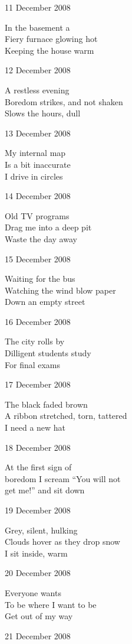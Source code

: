 \documentclass[12pt]{article}
\begin{document}
11 December 2008

In the basement a \\
Fiery furnace glowing hot \\
Keeping the house warm

12 December 2008

A restless evening \\
Boredom strikes, and not shaken \\
Slows the hours, dull

13 December 2008

My internal map \\
Is a bit inaccurate \\
I drive in circles

14 December 2008

Old TV programs \\
Drag me into a deep pit \\
Waste the day away

15 December 2008

Waiting for the bus \\
Watching the wind blow paper \\
Down an empty street

16 December 2008

The city rolls by \\
Dilligent students study  \\
For final exams

17 December 2008

The black faded brown \\
A ribbon stretched, torn, tattered \\
I need a new hat

\newpage

18 December 2008

At the first sign of \\
boredom I scream ``You will not \\
get me!'' and sit down

19 December 2008

Grey, silent, hulking \\
Clouds hover as they drop snow \\
I sit inside, warm

20 December 2008

Everyone wants \\
To be where I want to be \\
Get out of my way

21 December 2008
\end{document}
